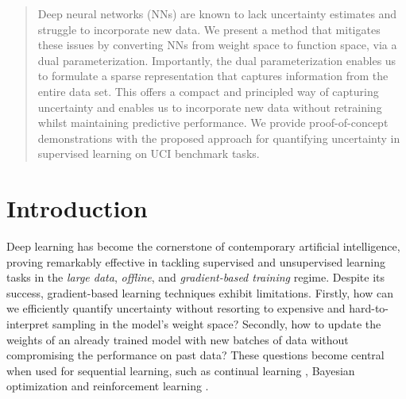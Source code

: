 \documentclass{article}
\begin{document}
\begin{abstract}
Deep neural networks (NNs) are known to lack uncertainty estimates and struggle to incorporate new data. We present a method that mitigates these issues by converting NNs from weight space to function space, via a dual parameterization. Importantly, the dual parameterization enables us to formulate a sparse representation that captures information from the entire data set. This offers a compact and principled way of capturing uncertainty and enables us to incorporate new data without retraining whilst maintaining predictive performance. We provide proof-of-concept demonstrations with the proposed approach for quantifying uncertainty in supervised learning on UCI benchmark tasks.
\end{abstract}

\section{Introduction}
%
Deep learning \citep{goodfellow2016deep} has become the cornerstone of contemporary artificial intelligence, proving remarkably effective in tackling supervised and unsupervised learning tasks in the {\em large data}, {\em offline}, and {\em gradient-based training} regime. Despite its success, gradient-based learning techniques exhibit limitations. Firstly, how can we efficiently quantify uncertainty without resorting to expensive and hard-to-interpret sampling in the model's weight space? Secondly, how to update the weights of an already trained model with new batches of data without compromising the performance on past data?
These questions become central when used for sequential learning,
such as continual learning \citep[CL,][]{parisi2019continual, de2021continual}, Bayesian optimization \citep[BO,][]{garnett_bayesoptbook_2022} and reinforcement learning  \citep[RL,][]{sutton2018reinforcement}.
\end{document}
